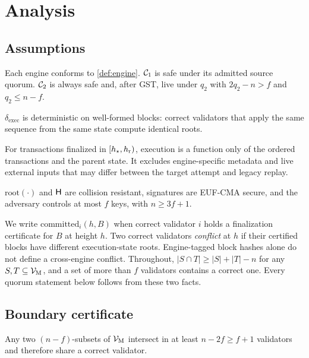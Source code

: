 \section{Analysis}
\label{sec:analysis}

\subsection{Assumptions}
\begin{assumption}
\label{as:engines}
Each engine conforms to \cref{def:engine}. $\mathcal{C}_1$ is safe under its admitted source quorum.
$\mathcal{C}_2$ is always safe and, after GST, live under $q_2$ with $2q_2-n>f$ and $q_2\le n-f$.
\end{assumption}

\begin{assumption}
\label{as:exec}
$\delta_{\mathrm{exec}}$ is deterministic on well-formed blocks: correct validators that apply the same
sequence from the same state compute identical roots.
\end{assumption}

\begin{assumption}
\label{as:metadata}
For transactions finalized in $[h_{\star},h_{\mathrm r})$, execution is a function only of the ordered transactions
and the parent state. It excludes engine-specific metadata and live external inputs that may differ
between the target attempt and legacy replay.
\end{assumption}

\begin{assumption}[Cryptography]
\label{as:crypto}
$\mathrm{root}(\cdot)$ and $\mathsf{H}$ are collision resistant, signatures are EUF-CMA secure, and the
adversary controls at most $f$ keys, with $n\ge3f+1$.
\end{assumption}

We write $\mathrm{committed}_i(h,B)$ when correct validator $i$ holds a finalization certificate for
$B$ at height $h$. Two correct validators \emph{conflict} at $h$ if their certified blocks have
different execution-state roots. Engine-tagged block hashes alone do not define a cross-engine conflict.
Throughout, $|S\cap T|\ge|S|+|T|-n$ for any $S,T\subseteq\mathcal{V}_{\mathrm M}$, and a set of more than $f$ validators
contains a correct one. Every quorum statement below follows from these two facts.

\subsection{Boundary certificate}
\begin{lemma}
\label{lem:qi}
Any two $(n-f)$-subsets of $\mathcal{V}_{\mathrm M}$ intersect in at least $n-2f\ge f+1$ validators and therefore share a
correct validator.
\end{lemma}

